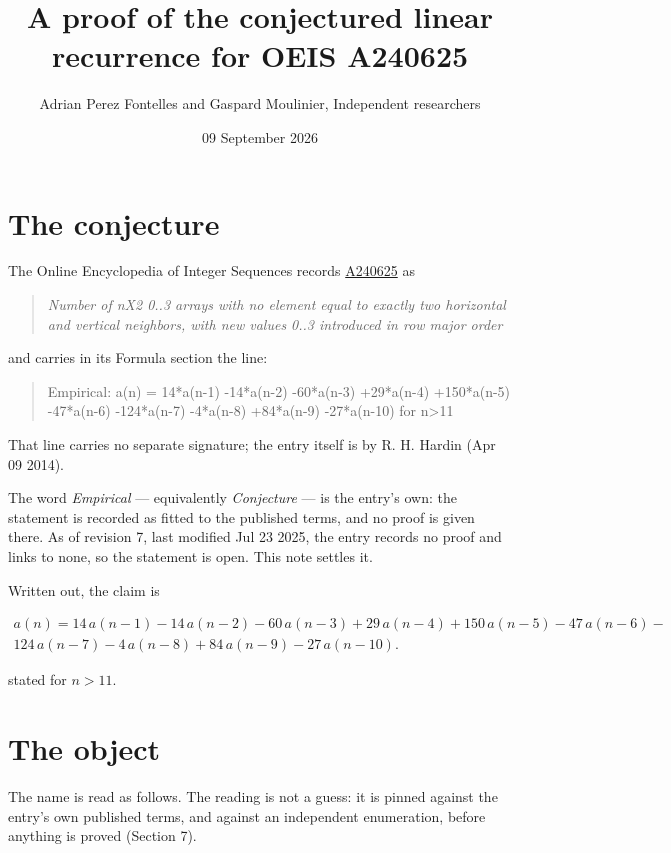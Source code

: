 \documentclass[11pt]{article}
\title{A proof of the conjectured linear recurrence for OEIS A240625}
\author{Adrian Perez Fontelles and Gaspard Moulinier, Independent researchers}
\date{09 September 2026}
\theoremstyle{definition}
\begin{document}
\maketitle
\section{The conjecture}

The Online Encyclopedia of Integer Sequences records \href{https://oeis.org/A240625}{A240625} as

\begin{quote}\itshape Number of nX2 0..3 arrays with no element equal to exactly two horizontal and vertical neighbors, with new values 0..3 introduced in row major order\end{quote}

and carries in its Formula section the line:

\begin{quote}\ttfamily Empirical: a(n) = 14*a(n-1) -14*a(n-2) -60*a(n-3) +29*a(n-4) +150*a(n-5) -47*a(n-6) -124*a(n-7) -4*a(n-8) +84*a(n-9) -27*a(n-10) for n>11\end{quote}

That line carries no separate signature; the entry itself is by R. H. Hardin (Apr 09 2014).

The word {\itshape Empirical} --- equivalently {\itshape Conjecture} --- is the entry's own: the statement is recorded as fitted to the published terms, and no proof is given there. As of revision 7, last modified Jul 23 2025, the entry records no proof and links to none, so the statement is open. This note settles it.

Written out, the claim is

\begin{multline*} a(n) = 14\,a(n-1) - 14\,a(n-2) - 60\,a(n-3) + 29\,a(n-4) + 150\,a(n-5) - 47\,a(n-6) - \\ 124\,a(n-7) - 4\,a(n-8) + 84\,a(n-9) - 27\,a(n-10). \end{multline*}

stated for $n > 11$.

\section{The object}

The name is read as follows. The reading is not a guess: it is pinned against the entry's own published terms, and against an independent enumeration, before anything is proved (Section 7).
\end{document}
